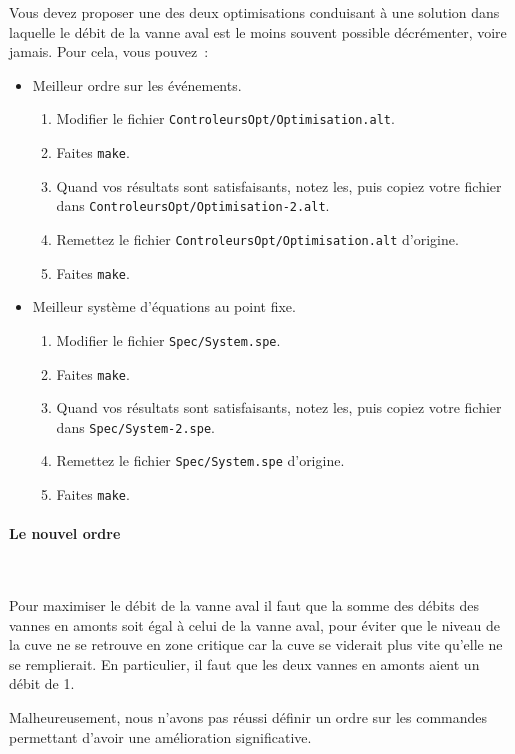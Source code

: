 \documentclass[a4paper]{book}
\begin{document}
Vous devez proposer une des deux optimisations conduisant à une solution dans laquelle le débit de la vanne aval est le moins souvent possible décrémenter, voire jamais. Pour cela, vous pouvez~:
\begin{itemize}
\item Meilleur ordre sur les événements.
  \begin{enumerate}
  \item Modifier le fichier \texttt{ControleursOpt/Optimisation.alt}.
  \item Faites \texttt{make}.
  \item Quand vos résultats sont satisfaisants, notez les, puis copiez votre fichier dans \texttt{ControleursOpt/Optimisation-2.alt}.
  \item Remettez le fichier \texttt{ControleursOpt/Optimisation.alt} d'origine.
  \item Faites \texttt{make}.
  \end{enumerate}
\item Meilleur système d'équations au point fixe.
  \begin{enumerate}
  \item Modifier le fichier \texttt{Spec/System.spe}.
  \item Faites \texttt{make}.
  \item Quand vos résultats sont satisfaisants, notez les, puis copiez votre fichier dans \texttt{Spec/System-2.spe}.
  \item Remettez le fichier \texttt{Spec/System.spe} d'origine.
  \item Faites \texttt{make}.
  \end{enumerate}
\end{itemize}

\paragraph{Le nouvel ordre}\ \\
\small{}

Pour maximiser le débit de la vanne aval il faut que la somme des débits des
vannes en amonts soit égal à celui de la vanne aval, pour éviter que le niveau
de la cuve ne se retrouve en zone critique car la cuve se viderait plus vite
qu'elle ne se remplierait. En particulier, il faut que les deux vannes en amonts
aient un débit de 1.

Malheureusement, nous n'avons pas réussi définir un ordre sur les commandes
permettant d'avoir une amélioration significative.
\end{document}
